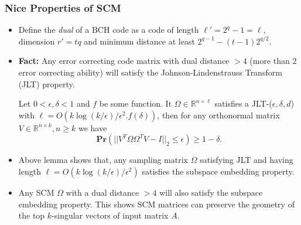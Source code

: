 \documentclass[9pt]{beamer}
\newcommand{\mB}{\mathbb}
\begin{document}
\begin{frame}
\frametitle{Nice Properties of SCM} 
\begin{itemize} 
\item Define the \textit{dual} of a BCH code as a code of length $\ell' = 2^q - 1 = \ell$, dimension $r' = tq$ and minimum distance at least $2^{q-1} - (t - 1)2^{q/2}$.
\vspace{3mm}

\item \textbf{Fact:} Any error correcting code matrix with dual distance $> 4$ (more than 2 error correcting ability) will satisfy the Johnson-Lindenstrauss Transform (JLT) property.
\vspace{3mm}

\begin{lemma}
Let $0< \epsilon, \delta < 1$ and $f$ be some function. It $\Omega \in \mB{R}^{n \times \ell}$ satisfies a JLT-($\epsilon, \delta, d$) with $\ell = O(k \log(k /\epsilon)/\epsilon^2. f(\delta))$, then for any orthonormal matrix $V \in \mB{R}^{n \times k}, n \ge k$ we have 
\[ \textbf{Pr}(|| V^T \Omega \Omega^TV - I||_2 \le \epsilon) \ge 1 - \delta. \]
\end{lemma}
\vspace{3mm}

\item Above lemma shows that, any sampling matrix $\Omega$ satisfying JLT and having length $\ell = O(k \log(k/\epsilon) / \epsilon^2)$ satisfies the subspace embedding property.
\vspace{3mm}

\item Any SCM $\Omega$ with a dual distance $> 4$ will also satisfy the subspace embedding property. This shows SCM matrices can preserve the geometry of the top $k$-singular vectors of input matrix $A$.
\end{itemize}
\end{frame}
\end{document}

